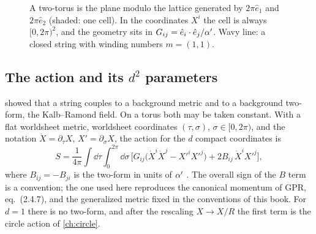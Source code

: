 \begin{figure}[t]
\centering
{}
\caption{A two-torus is the plane modulo the lattice generated by $2\pi\hat e_1$ and
$2\pi\hat e_2$ (shaded: one cell). In the coordinates $X^i$ the cell is always
$[0,2\pi)^2$, and the geometry sits in $G_{ij}=\hat e_i\cdot\hat e_j/\alpha'$. Wavy line: a closed
string with winding numbers $m=(1,1)$.}
\label{fig:narain:torus}
\end{figure}

\subsection{The action and its \texorpdfstring{$d^2$}{d squared} parameters}

 showed that a string couples to a background metric and to a background
two-form, the Kalb--Ramond field. On a torus both may
be taken constant. With a flat worldsheet metric, worldsheet coordinates $(\tau,\sigma)$,
$\sigma\in[0,2\pi)$, and the notation $\dot X=\partial_\tau X$, $X'=\partial_\sigma X$, the
action for the $d$ compact coordinates is
\begin{equation}\label{eq:narain:action}
 S=\frac1{4\pi}\int\!\dd\tau\int_0^{2\pi}\!\dd\sigma\,
 \Big[G_{ij}\big(\dot X^i\dot X^j-X'^iX'^j\big)+2B_{ij}\,\dot X^iX'^j\Big],
\end{equation}
where $B_{ij}=-B_{ji}$ is the two-form in units of $\alpha'$
. The overall sign of the $B$ term is a
convention; the one used here reproduces the canonical momentum of GPR, eq.~(2.4.7), and the
generalized metric fixed in the conventions of this book. For $d=1$ there is no two-form, and
after the rescaling $X\to X/R$ the first term is the circle action of \cref{ch:circle}.

